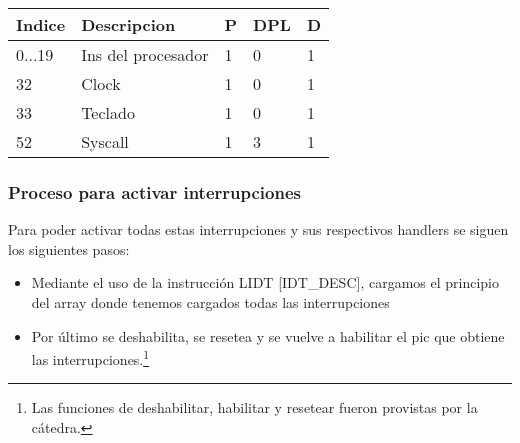 \begin{tabular}{l l l l l}
Indice & Descripcion & P & DPL & D\\

\hline
0...19 & Ins del procesador & 1 & 0 & 1 \\
32 & Clock & 1 & 0 & 1\\
33 & Teclado	 & 1 & 0 & 1\\
52 & Syscall & 1 & 3 & 1\\
\end{tabular}

\subsubsection{Proceso para activar interrupciones}

Para poder activar todas estas interrupciones y sus respectivos handlers se siguen los siguientes pasos:\\
\begin{itemize}
 \item Mediante el uso de la instrucci\'on LIDT [IDT\_DESC], cargamos el principio del array donde tenemos cargados todas las interrupciones
 \item Por \'ultimo se deshabilita, se resetea y se vuelve a habilitar el pic que obtiene las interrupciones.\footnote{Las funciones de 
deshabilitar, habilitar y resetear fueron provistas por la c\'atedra.}
\end{itemize}
